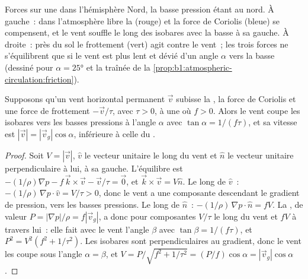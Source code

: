 \begin{omfigure}
{\small Forces sur une  dans l'hémisphère Nord, la basse pression étant au
nord. À gauche~: dans l'atmosphère libre la  (rouge) et la
force de Coriolis (bleue) se compensent, et le vent souffle le long des isobares avec la basse à
sa gauche. À droite~: près du sol le frottement (vert) agit contre le vent~; les
trois forces ne s'équilibrent que si le vent est plus lent et dévié d'un angle $\alpha$
vers la basse (dessiné pour $\alpha = \ang{25}$ et la traînée de la
\cref{prop:b1:atmospheric-circulation:friction}).}
\label{fig:b1:atmospheric-circulation:balance}
\end{omfigure}

\begin{proposition}\label{prop:b1:atmospheric-circulation:friction}
Supposons qu'un vent horizontal permanent $\vec v$ subisse la ,
la force de Coriolis et une force de frottement $-\vec v/\tau$, avec $\tau > 0$, à une
 où $f > 0$. Alors le vent coupe les isobares vers les basses pressions à
l'angle $\alpha$ avec $\tan\alpha = 1/(f\tau)$, et sa vitesse est $|\vec v| =
|\vec v_g|\cos\alpha$, inférieure à celle du .
\end{proposition}

\begin{proof}
Soit $V = |\vec v|$, $\hat v$ le vecteur unitaire le long du vent et $\hat n$ le vecteur
unitaire perpendiculaire à lui, à sa gauche. L'équilibre est $-(1/\rho)\nabla p - f\,
\vec k\times\vec v - \vec v/\tau = \vec 0$, et $\vec k\times\vec v = V\hat n$.
Le long de $\hat v$~: $-(1/\rho)\,\nabla p\cdot\hat v = V/\tau > 0$, donc le vent a
une composante descendant le gradient de pression, vers les basses pressions. Le long de $\hat n$~:
$-(1/\rho)\,\nabla p\cdot\hat n = fV$. La , de valeur $P =
|\nabla p|/\rho = f|\vec v_g|$, a donc pour composantes $V/\tau$ le long du vent et
$fV$ à travers lui~: elle fait avec le vent l'angle $\beta$ avec $\tan\beta =
1/(f\tau)$, et $P^2 = V^2(f^2 + 1/\tau^2)$. Les isobares sont perpendiculaires au
gradient, donc le vent les coupe sous l'angle $\alpha = \beta$, et $V = P/\sqrt{f^2 +
1/\tau^2} = (P/f)\cos\alpha = |\vec v_g|\cos\alpha$.
\end{proof}

